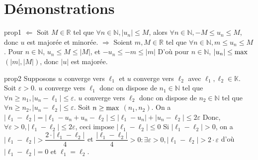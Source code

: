 \documentclass[12pt,a4paper]{report}
\begin{document}
\newpage

\section{Démonstrations}

\begin{demonstration}{prop1}
$\Longleftarrow$ Soit $M \in \mathbb{R}$ tel que $\forall n \in \mathbb{N}, \lvert u_n \rvert \leq M$, alors $\forall n \in \mathbb{N}, -M \leq u_n \leq M$, donc $u$ est majorée et minorée.
\newline $\Longrightarrow$ Soient $m,M \in \mathbb{R}$ tel que $\forall n \in \mathbb{N}, m \leq u_n \leq M$.
\newline Pour $n \in \mathbb{N}$, $u_n \leq M \leq \lvert M \rvert$, et $-u_n \leq -m \leq \lvert m \rvert$
\newline D'où pour $n \in \mathbb{N}$, $\lvert u_n \rvert \leq \rm{max}$ $(\lvert m \rvert, \lvert M \rvert)$, donc $\lvert u \rvert$ est majorée.
\end{demonstration}

\begin{demonstration}{prop2}
Supposons $u$ converge vers $\ell_1$ et $u$ converge vers $\ell_2$ avec $\ell_1,\ell_2 \in \mathbb{K}$.
\newline Soit $\varepsilon > 0$. $u$ converge vers $\ell_1$ donc on dispose de $n_1 \in \mathbb{N}$ tel que $\forall n \geq n_1, \lvert u_n - \ell_1 \rvert \leq \varepsilon$.
\newline $u$ converge vers $\ell_2$ donc on dispose de $n_2 \in \mathbb{N}$ tel que $\forall n \geq n_2, \lvert u_n - \ell_2 \rvert \leq \varepsilon$.
\newline \newline Soit $n \geq \rm{max}$ $(n_1,n_2)$. On a $\lvert \ell_1-\ell_2 \rvert = \lvert \ell_1-u_n+u_n-\ell_2 \rvert \leq \lvert \ell_1-u_n \rvert + \lvert u_n - \ell_2 \rvert \leq 2\varepsilon$
\newline Donc, $\forall \varepsilon > 0, \lvert \ell_1-\ell_2 \rvert \leq 2 \varepsilon$, ceci impose $\lvert \ell_1-\ell_2 \rvert \leq 0$
\newline \newline Si $\lvert \ell_1 - \ell_2 \rvert > 0$, on a $\lvert \ell_1 - \ell_2 \rvert > \dfrac{2 \cdot\lvert \ell_1-\ell_2 \rvert}{4}$ et $\dfrac{\lvert \ell_1-\ell_2 \rvert}{4} > 0 : \exists \varepsilon > 0, \lvert \ell_1-\ell_2 \rvert > 2\cdot\varepsilon$
\newline d'où $\lvert \ell_1-\ell_2 \rvert = 0$ et $\ell_1=\ell_2$.
\end{demonstration}
\end{document}
